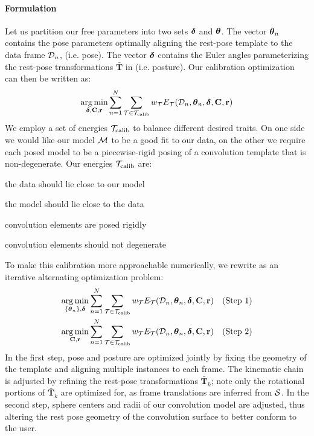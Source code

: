 \paragraph{Formulation}
Let us partition our free parameters into two sets $\boldsymbol{\delta}$ and $\boldsymbol{\theta}$. 
The vector $\boldsymbol{\theta}_n$ contains the pose parameters optimally aligning the rest-pose template to the data frame $\mathcal{D}_n$, (i.e. pose). 
The vector $\boldsymbol{\delta}$ contains the Euler angles parameterizing the rest-pose transformations $\mathbf{\bar{T}}$ in  (i.e. posture).
% 
Our calibration optimization can then be written as:
\begin{eqnarray}
\operatorname*{arg\,min}_{\boldsymbol{\delta}, \mathbf{C}, \mathbf{r}}
\sum_{n=1}^N 
\sum_{\mathcal{T} \in {\mathcal{T}_\text{calib}}} 
w_\mathcal{T} E_\mathcal{T}(\mathcal{D}_n, \boldsymbol{\theta}_n, \boldsymbol{\delta}, \mathbf{C}, \mathbf{r})
\label{eq:calibration}
\end{eqnarray}
% 
We employ a set of energies ${\mathcal{T}_\text{calib}}$ to balance different desired traits. On one side we would like our model $\mathcal{M}$ to be a good fit to our data, on the other we require each posed model to be a piecewise-rigid posing of a convolution template that is non-degenerate. Our energies ${\mathcal{T}_\text{calib}}$ are:
% 
\begin{description}[labelsep=0em,labelwidth=.4in,labelindent=1cm]
\item[d2m] the data should lie close to our model
\item[m2d] the model should lie close to the data
\item[rigid] convolution elements are posed rigidly
\item[valid] convolution elements should not degenerate
\end{description}
% 
To make this calibration more approachable numerically, we rewrite  as an iterative alternating optimization problem:
% 
\begin{eqnarray}
\operatorname*{arg\,min}_{{\{\boldsymbol{\theta}_n\}},\boldsymbol{\delta}} 
\sum_{n=1}^N 
\sum_{\mathcal{T} \in {\mathcal{T}_\text{calib}}}
w_\mathcal{T} E_\mathcal{T}(\mathcal{D}_n, \boldsymbol{\theta}_n, \boldsymbol{\delta}, \mathbf{C}, \mathbf{r}) 
&& \text{(Step 1)}
\label{eq:step1}
\\
\operatorname*{arg\,min}_{\mathbf{C}, \mathbf{r}} 
\sum_{n=1}^N 
\sum_{\mathcal{T} \in {\mathcal{T}_\text{calib}}}
w_\mathcal{T} E_\mathcal{T}(\mathcal{D}_n, \boldsymbol{\theta}_n, \boldsymbol{\delta}, \mathbf{C}, \mathbf{r})
&& \text{(Step 2)}
\label{eq:step2}
\end{eqnarray}
% 
In the first step, pose and posture are optimized jointly by fixing the geometry of the template and aligning multiple instances to each frame. The kinematic chain is adjusted by refining the rest-pose transformations $\mathbf{\bar{T}}_k$; note only the rotational portions of $\mathbf{\bar{T}}_k$ are optimized for, as frame translations are inferred from $\mathcal{S}$. In the second step, sphere centers and radii of our convolution model are adjusted, thus altering the rest pose geometry of the convolution surface to better conform to the user.

